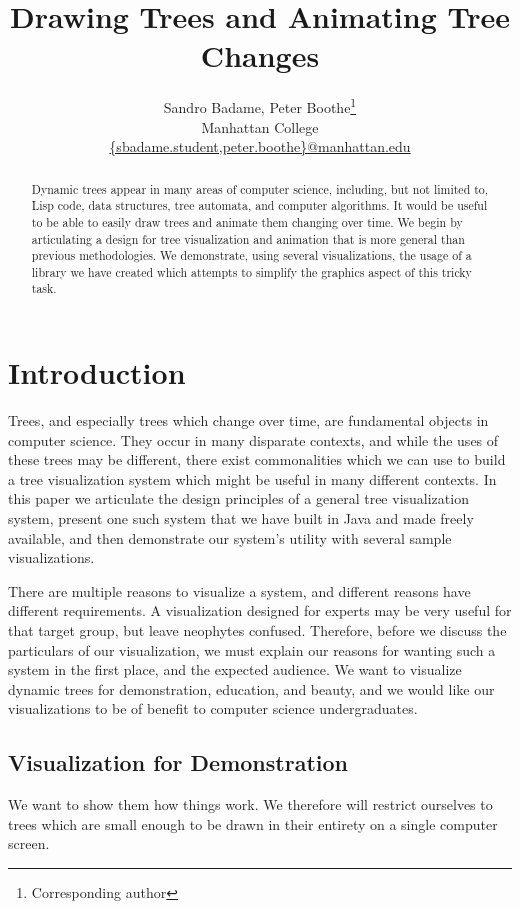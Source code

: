 \documentclass{article}
\title{Drawing Trees and Animating Tree Changes}
\author{Sandro Badame, Peter Boothe\footnote{Corresponding author}\\
 Manhattan College\\
\url{{sbadame.student,peter.boothe}@manhattan.edu}}
\begin{document}
\maketitle

\begin{abstract}
Dynamic trees appear in many areas of computer science, including, but not
limited to, Lisp code, data structures, tree automata, and computer
algorithms.  It would be useful to be able to easily draw trees and animate
them changing over time.  We begin by articulating a design for tree
visualization and animation that is more general than previous methodologies.
We demonstrate, using several visualizations, the
usage of a library we have created which attempts to simplify the graphics
aspect of this tricky task.\end{abstract}

\section{Introduction}
Trees, and especially trees which change over time, are fundamental objects in
computer science.  They occur in many disparate contexts, and while the uses of
these trees may be different, there exist commonalities which we can use to
build a tree visualization system which might be useful in many different
contexts.  In this paper we articulate the design principles of a general tree visualization system, present one such system that we have built in Java and made freely available, and then demonstrate our system's utility with several sample visualizations.

There are multiple reasons to visualize a system, and different reasons have
different requirements.  A visualization designed for experts may be very
useful for that target group, but leave neophytes confused.  Therefore, before
we discuss the particulars of our visualization, we must explain our reasons
for wanting such a system in the first place, and the expected audience.  We
want to visualize dynamic trees for demonstration, education, and beauty, and
we would like our visualizations to be of benefit to computer science
undergraduates.

\subsection{Visualization for Demonstration}

We want to show them how things work.  We therefore will restrict ourselves to trees which are small enough to be drawn in their entirety on a single computer screen.
\end{document}
